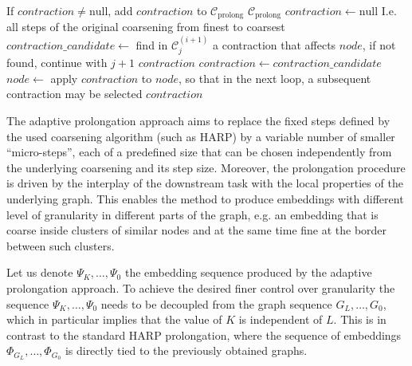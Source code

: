 \documentclass[sn-mathphys,pdflatex,iicol]{sn-jnl}%
\begin{document}
\begin{algorithm*}
\begin{algorithmic}
            \State If $ contraction \neq \mathrm{null} $, add $ contraction $ to $ \mathcal{C}_\mathrm{prolong} $
        \EndFor
        \State \Return $ \mathcal{C}_\mathrm{prolong} $
    \EndFunction
    \Statex
        \State $ contraction \gets \mathrm{null} $
         \Comment I.e. all steps of the original coarsening from finest to coarsest
            \State $ contraction\_candidate \gets $ find in $ \mathcal{C}_j^{(i + 1)} $ a contraction that affects $ node $, if not found, continue with $ j + 1 $
                \State \Return $ contraction $
            \EndIf
            \State $ contraction \gets contraction\_candidate $
            \State $ node \gets $ apply $ contraction $ to $ node $, so that in the next loop, a subsequent contraction may be selected
        \EndFor
        \State \Return $ contraction $
    \EndFunction
  \end{algorithmic}
\end{algorithm*}

The adaptive prolongation approach aims to replace the fixed steps defined by the used coarsening algorithm (such as HARP) by a variable number of smaller \enquote{micro-steps}, each of a predefined size that can be chosen independently from the underlying coarsening and its step size. Moreover, the prolongation procedure is driven by the interplay of the downstream task with the local properties of the underlying graph. This enables the method to produce embeddings with different level of granularity in different parts of the graph, e.g. an embedding that is coarse inside clusters of similar nodes and at the same time fine at the border between such clusters.

Let us denote \( \Psi_K, \dots, \Psi_0 \) the embedding sequence produced by the adaptive prolongation approach. To achieve the desired finer control over granularity the sequence \( \Psi_K, \dots, \Psi_0 \) needs to be decoupled from the graph sequence \( G_L, \dots, G_0 \), which in particular implies that the value of \( K \) is independent of \( L \). This is in contrast to the standard HARP prolongation, where the sequence of embeddings \( \Phi_{G_L}, \dots, \Phi_{G_0} \) is directly tied to the previously obtained graphs.
\end{document}
